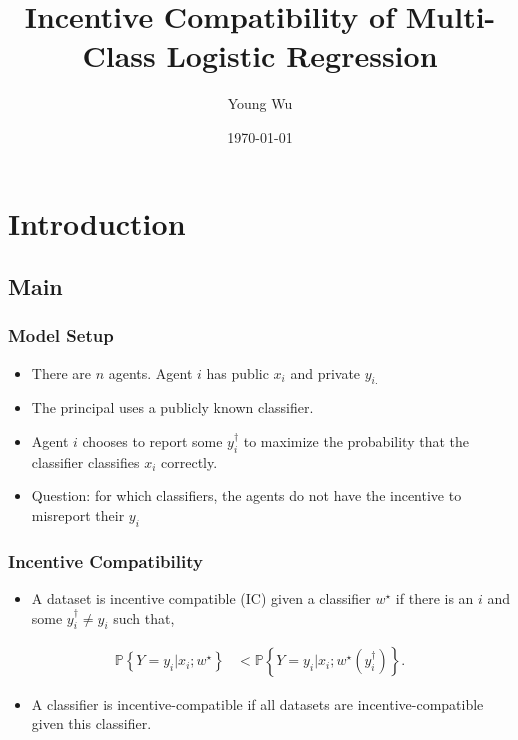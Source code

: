 \documentclass{beamer}
\title{Incentive Compatibility of Multi-Class Logistic Regression}
\author{Young Wu}
\date{\today}
\begin{document}
\newtheorem{thm}{Theorem}
\newtheorem{cor}{Corollary}
\newtheorem{lem}{Lemma}
\newtheorem{prop}{Proposition}
\newtheorem{conj}{Conjecture}
\newtheorem{algo}{Algorithm}
\newtheorem{obs}{Observation}
\newtheorem{clm}{Claim}
\theoremstyle{definition}
\newtheorem{df}{Definition}
\newtheorem{eg}{Example}
\newtheorem{asm}{Assumption}
\newtheorem{cond}{Condition}
\theoremstyle{remark}
\newtheorem{rmk}{Remark}
\begin{frame} \titlepage \end{frame}


\section{Introduction} \subsection{Main}

\begin{frame} \frametitle{Model Setup}
\begin{itemize}
\item There are $n $ agents. Agent $i $ has public $x_{i}$ and private $y_{i.}$
\item The principal uses a publicly known classifier.
\item Agent $i $ chooses to report some $y^{\dagger}_{i}$ to maximize the probability that the classifier classifies $x_{i}$ correctly.
\item Question: for which classifiers, the agents do not have the incentive to misreport their $y_{i}$
\end{itemize}
\end{frame}

\begin{frame} \frametitle{Incentive Compatibility}
\begin{itemize}
\item A dataset is incentive compatible (IC) given a classifier $w^\star $ if there is an $i $ and some $y^{\dagger}_{i} \neq  y_{i}$ such that,
\end{itemize}\begin{align*}
\mathbb{P}\left\{Y = y_{i} | x_{i} ; w^\star \right\} &< \mathbb{P}\left\{Y = y_{i} | x_{i} ; w^\star \left(y^{\dagger}_{i}\right)\right\}.
\end{align*}
\begin{itemize}
\item A classifier is incentive-compatible if all datasets are incentive-compatible given this classifier.
\end{itemize}
\end{frame}
\end{document}

